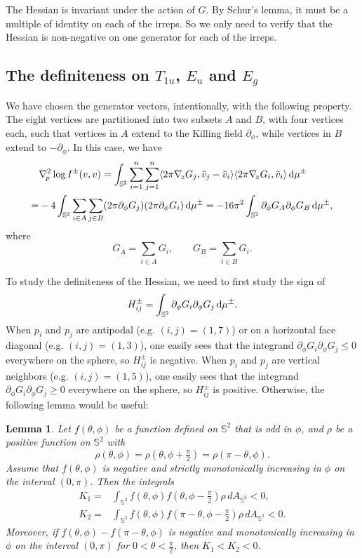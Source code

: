 \documentclass[a4paper]{amsart}
\newcommand{\uS}{\mathbb{S}}
\newcommand{\sph}{{\uS^2}}
\newcommand{\Hess}{\nabla^2}
\newcommand{\dd}{{\rm d}}
\theoremstyle{plain} %
\newtheorem*{lemma}{Lemma}
\theoremstyle{definition} %
\theoremstyle{remark}
\begin{document}
The Hessian is invariant under the action of $G$.  By Schur's lemma, it must be
a multiple of identity on each of the irreps.  So we only need to verify that
the Hessian is non-negative on one generator for each of the irreps.

\subsection{The definiteness on \texorpdfstring{$T_{1u}$}{T1u}, \texorpdfstring{$E_u$}{Eu} and \texorpdfstring{$E_g$}{Eg}}

We have chosen the generator vectors, intentionally, with the following
property.  The eight vertices are partitioned into two subsets $A$ and $B$,
with four vertices each, such that vertices in $A$ extend to the Killing field
$\partial_\phi$, while vertices in $B$ extend to $-\partial_\phi$.  In this
case, we have
\begin{align*}
	&\Hess_{\! p} \log I^\pm (v, v)
	=
	\int_{\uS^2} \sum_{i=1}^n \sum_{j=1}^n \langle 2\pi \nabla_{\! z} G_j, \tilde v_j - \tilde v_i \rangle \langle 2\pi \nabla_{\! z} G_i, \tilde v_i \rangle \, \dd \mu^\pm\\
	=& -4
	\int_{\uS^2} \sum_{i \in A} \sum_{j \in B} (2\pi \partial_\phi G_j)(2\pi \partial_\phi G_i) \, \dd \mu^\pm
	= -16\pi^2 \int_{\uS^2} \partial_\phi G_A \partial_\phi G_B \, \dd \mu^\pm,
\end{align*}
where
\[
	G_A = \sum_{i \in A} G_i, \qquad G_B = \sum_{i \in B} G_i.
\]

To study the definiteness of the Hessian, we need to first study the sign of
\[
	H^\pm_{ij} = \int_{\uS^2} \partial_\phi G_i \partial_\phi G_j \,
	\dd \mu^\pm.
\]
When $p_i$ and $p_j$ are antipodal (e.g. $(i,j) = (1,7)$) or on a horizontal
face diagonal (e.g. $(i,j) = (1,3)$), one easily sees that the integrand
$\partial_\phi G_i \partial_\phi G_j \le 0$ everywhere on the sphere, so
$H^\pm_{ij}$ is negative.  When $p_i$ and $p_j$ are vertical neighbors (e.g.
$(i,j) = (1,5)$), one easily sees that the integrand $\partial_\phi G_i
\partial_\phi G_j \ge 0$ everywhere on the sphere, so $H^\pm_{ij}$ is positive.
Otherwise, the following lemma would be useful:

\begin{lemma}
	Let $f(\theta, \phi)$ be a function defined on $\uS^2$ that is odd in $\phi$,
	and $\rho$ be a positive function on $\uS^2$ with
	\[
		\rho(\theta, \phi) = \rho(\theta, \phi+\tfrac{\pi}{2}) = \rho(\pi - \theta, \phi).
	\]
	Assume that $f(\theta, \phi)$ is negative and strictly monotonically
	increasing in $\phi$ on the interval $(0, \pi)$.  Then the integrals
	\begin{align*}
		K_1 =& \int_{\uS^2} f(\theta, \phi) f(\theta, \phi - \tfrac{\pi}{2}) \rho \, dA_\sph < 0,\\
		K_2 =& \int_{\uS^2} f(\theta, \phi) f(\pi - \theta, \phi - \tfrac{\pi}{2}) \rho \, dA_\sph < 0.
	\end{align*}
	Moreover, if $f(\theta, \phi) - f(\pi - \theta, \phi)$ is negative and
	monotonically increasing in $\phi$ on the interval $(0, \pi)$ for $0 < \theta
	< \tfrac{\pi}{2}$, then $K_1 < K_2 < 0$.
\end{lemma}
\end{document}
